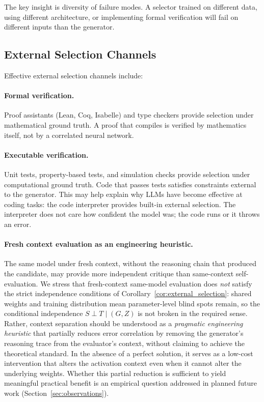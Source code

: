 \documentclass[11pt]{article}
\begin{document}
The key insight is diversity of failure modes. A selector trained on different data, using
different architecture, or implementing formal verification will fail on different inputs
than the generator.

\subsection{External Selection Channels}

Effective external selection channels include:

\paragraph{Formal verification.} Proof assistants (Lean, Coq, Isabelle) and type checkers
provide selection under mathematical ground truth. A proof that compiles is verified by
mathematics itself, not by a correlated neural network.

\paragraph{Executable verification.} Unit tests, property-based tests, and simulation checks
provide selection under computational ground truth. Code that passes tests satisfies
constraints external to the generator. This may help explain why LLMs have become effective
at coding tasks: the code interpreter provides built-in external selection. The interpreter
does not care how confident the model was; the code runs or it throws an error.

\paragraph{Fresh context evaluation as an engineering heuristic.} The same model under
fresh context, without the reasoning chain that produced the candidate, may provide more
independent critique than same-context self-evaluation. We stress that fresh-context
same-model evaluation does \emph{not} satisfy the strict independence conditions of
Corollary~\ref{cor:external_selection}: shared weights and training distribution mean
parameter-level blind spots remain, so the conditional independence $S \perp T \mid (G, Z)$
is not broken in the required sense. Rather, context separation should be understood as a
\emph{pragmatic engineering heuristic} that partially reduces error correlation by removing
the generator's reasoning trace from the evaluator's context, without claiming to achieve
the theoretical standard. In the absence of a perfect solution, it serves as a low-cost
intervention that alters the activation context even when it cannot alter the underlying
weights. Whether this partial reduction is sufficient to yield meaningful practical benefit
is an empirical question addressed in planned future work
(Section~\ref{sec:observations}).
\end{document}
